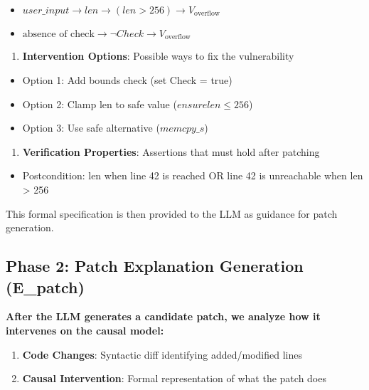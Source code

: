 \documentclass[conference,compsoc]{IEEEtran}
\providecommand{\tightlist}{\setlength{\itemsep}{0pt}\setlength{\parskip}{0pt}}
\begin{document}
\begin{itemize}
\item
  \(user\_input \rightarrow len \rightarrow (len > 256) \rightarrow V_{\text{overflow}}\)
\item
  \(\text{absence of check} \rightarrow \lnot Check \rightarrow V_{\text{overflow}}\)
\end{itemize}

\begin{enumerate}
\def\labelenumi{\arabic{enumi}.}
\setcounter{enumi}{4}
\tightlist
\item
  \textbf{Intervention Options}: Possible ways to fix the vulnerability
\end{enumerate}

\begin{itemize}
    \item Option 1: Add bounds check (set Check = true)
    \item Option 2: Clamp len to safe value ($ensure len \leq 256$)
    \item Option 3: Use safe alternative ($memcpy \_ s$)
\end{itemize}

\begin{enumerate}
\def\labelenumi{\arabic{enumi}.}
\setcounter{enumi}{5}
\tightlist
\item
  \textbf{Verification Properties}: Assertions that must hold after
  patching
\end{enumerate}

\begin{itemize}
\tightlist
\item
  Postcondition: len  when line 42 is reached OR line 42 is
  unreachable when len \textgreater{} 256
\end{itemize}

This formal specification is then provided to the LLM as guidance for
patch generation.

\subsection{Phase 2: Patch Explanation Generation
(E\_patch)}\label{phase-2-patch-explanation-generation-e_patch}

\textbf{After the LLM generates a candidate patch, we analyze how it
intervenes on the causal model:}

\begin{enumerate}
\def\labelenumi{\arabic{enumi}.}
\item
  \textbf{Code Changes}: Syntactic diff identifying added/modified lines
\item
  \textbf{Causal Intervention}: Formal representation of what the patch
  does
\end{enumerate}
\end{document}
